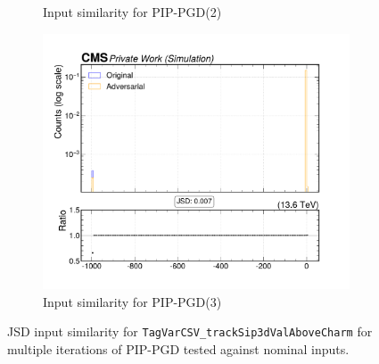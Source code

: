 \begin{figure}[htbp]
\begin{subfigure}[t]{0.32\textwidth}
    \caption*{Input similarity for PIP-PGD(2)}
  \end{subfigure}\hfill
  \begin{subfigure}[t]{0.32\textwidth}
    \includegraphics[width=\linewidth]{media/output/features/compare/combined_it_3/cmp_global_features_TagVarCSV_trackSip3dValAboveCharm.pdf}
    \caption*{Input similarity for PIP-PGD(3)}
  \end{subfigure}

  \caption*{JSD input similarity for \texttt{TagVarCSV\_trackSip3dValAboveCharm} for multiple iterations of PIP-PGD tested against nominal inputs.}
  \label{fig:combined_input_TagVarCSV_trackSip3dValAboveCharm}
\end{figure}

